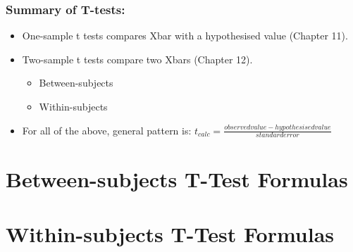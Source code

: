 \documentclass[11pt]{report}
\begin{document}
\subsubsection{Summary of T-tests:}
\begin{itemize}
    \item One-sample t tests compares Xbar with a hypothesised value (Chapter 11).
    \item Two-sample t tests compare two Xbars (Chapter 12).
    \begin{itemize}
        \item Between-subjects
        \item Within-subjects
    \end{itemize}
    \item For all of the above, general pattern is: $t_{calc} = \frac{observed value - hypothesised value}{standard error}$
\end{itemize}

\section{Between-subjects T-Test Formulas}

\section{Within-subjects T-Test Formulas}
\end{document}
